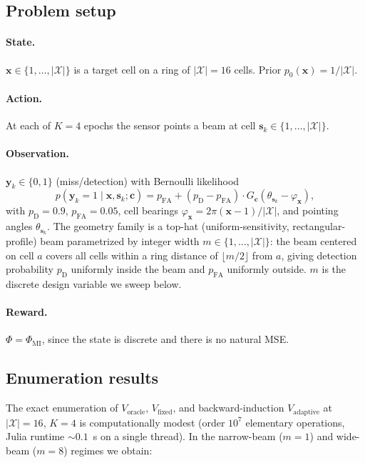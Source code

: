\documentclass[11pt,a4paper,onecolumn]{article}
\newcommand{\bx}{\bm{x}}
\newcommand{\bc}{\bm{c}}
\newcommand{\bs}{\bm{s}}
\newcommand{\by}{\bm{y}}
\begin{document}
\subsection{Problem setup}

\paragraph{State.}  $\bx \in \{1, \ldots, |\mathcal{X}|\}$ is a target cell on a ring of $|\mathcal{X}| = 16$ cells.  Prior $p_0(\bx) = 1/|\mathcal{X}|$.

\paragraph{Action.}  At each of $K = 4$ epochs the sensor points a beam at cell $\bs_k \in \{1, \ldots, |\mathcal{X}|\}$.

\paragraph{Observation.}  $\by_k \in \{0, 1\}$ (miss/detection) with Bernoulli likelihood
\begin{equation}
p(\by_k = 1 \mid \bx, \bs_k; \bc) = p_\mathrm{FA} + (p_\mathrm{D} - p_\mathrm{FA}) \cdot G_{\bc}(\theta_{\bs_k} - \varphi_{\bx}),
\end{equation}
with $p_\mathrm{D} = 0.9$, $p_\mathrm{FA} = 0.05$, cell bearings $\varphi_{\bx} = 2\pi(\bx - 1)/|\mathcal{X}|$, and pointing angles $\theta_{\bs_k}$.  The geometry family is a top-hat (uniform-sensitivity, rectangular-profile) beam parametrized by integer width $m \in \{1, \ldots, |\mathcal{X}|\}$: the beam centered on cell $a$ covers all cells within a ring distance of $\lfloor m/2 \rfloor$ from $a$, giving detection probability $p_\mathrm{D}$ uniformly inside the beam and $p_\mathrm{FA}$ uniformly outside.  $m$ is the discrete design variable we sweep below.

\paragraph{Reward.}  $\Phi = \Phi_{\text{MI}}$, since the state is discrete and there is no natural MSE.

\subsection{Enumeration results}

The exact enumeration of $V_{\text{oracle}}$, $V_{\text{fixed}}$, and backward-induction $V_{\text{adaptive}}$ at $|\mathcal{X}| = 16$, $K = 4$ is computationally modest (order $10^7$ elementary operations, Julia runtime $\sim 0.1$~s on a single thread).  In the narrow-beam ($m = 1$) and wide-beam ($m = 8$) regimes we obtain:
\end{document}
